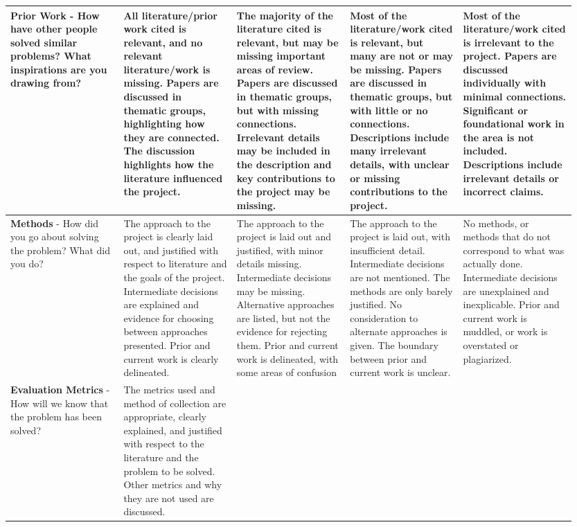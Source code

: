 \documentclass[10pt,twocolumn]{article}
\begin{document}
\begin{landscape}
\begin{longtable}{p{0.19\linewidth} | p{0.19\linewidth} | p{0.19\linewidth} | p{0.19\linewidth} | p{0.19\linewidth}}
\midrule
\textbf{Prior Work} - How have other people solved similar problems? What inspirations are you drawing from?
    & \cellcolor{excellent} All literature/prior work cited is relevant, and no relevant literature/work is missing. Papers are discussed in thematic groups, highlighting how they are connected. The discussion highlights how the literature influenced the project.
    & \cellcolor{good} The majority of the literature cited is relevant, but may be missing important areas of review. Papers are discussed in thematic groups, but with missing connections. Irrelevant details may be included in the description and key contributions to the project may be missing.
    & \cellcolor{marginal} Most of the literature/work cited is relevant, but many are not or may be missing. Papers are discussed in thematic groups, but with little or no connections. Descriptions include many irrelevant details, with unclear or missing contributions to the project.
    & \cellcolor{unacceptable} Most of the literature/work cited is irrelevant to the project. Papers are discussed individually with minimal connections. Significant or foundational work in the area is not included. Descriptions include irrelevant details or incorrect claims. \\
\midrule
\textbf{Methods} - How did you go about solving the problem? What did you do?
    & \cellcolor{excellent} The approach to the project is clearly laid out, and justified with respect to literature and the goals of the project. Intermediate decisions are explained and evidence for choosing between approaches presented. Prior and current work is clearly delineated.
    & \cellcolor{good} The approach to the project is laid out and justified, with minor details missing. Intermediate decisions may be missing. Alternative approaches are listed, but not the evidence for rejecting them. Prior and current work is delineated, with some areas of confusion
    & \cellcolor{marginal} The approach to the project is laid out, with insufficient detail. Intermediate decisions are not mentioned. The methods are only barely justified. No consideration to alternate approaches is given. The boundary between prior and current work is unclear.
    & \cellcolor{unacceptable} No methods, or methods that do not correspond to what was actually done. Intermediate decisions are unexplained and inexplicable. Prior and current work is muddled, or work is overstated or plagiarized. \\
\midrule
\textbf{Evaluation Metrics} - How will we know that the problem has been solved?
    & \cellcolor{excellent} The metrics used and method of collection are appropriate, clearly explained, and justified with respect to the literature and the problem to be solved. Other metrics and why they are not used are discussed.

\end{longtable}
\end{landscape}
\end{document}

